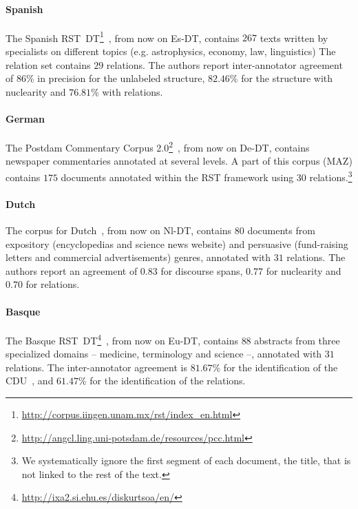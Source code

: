 \documentclass[11pt]{article}
\newcommand{\pcc}{De-DT}
\newcommand{\barst}{Eu-DT}
\newcommand{\sprst}{Es-DT}
\newcommand{\durst}{Nl-DT}
\begin{document}
\paragraph{Spanish}

The Spanish RST~DT\footnote{\url{http://corpus.iingen.unam.mx/rst/index_en.html}}~\cite{dacunha:spanish:2011}, from now on \sprst, contains $267$ texts written by specialists on different topics (e.g. astrophysics, economy, law, linguistics)
The relation set contains $29$ relations.
The authors report inter-annotator agreement of $86$\% in precision for the unlabeled structure, $82.46$\% for the structure with nuclearity and $76.81$\% with relations.

\paragraph{German}

The Postdam Commentary  Corpus 2.0\footnote{\url{http://angcl.ling.uni-potsdam.de/resources/pcc.html}}~\cite{stede:postdam:2004,stede:postdam:2014}, from now on \pcc, contains newspaper commentaries annotated at several levels.
A part of this corpus (MAZ) contains $175$ documents annotated within the  RST framework using $30$ relations.\footnote{We systematically ignore the first segment of each document, the title, that is not linked to the rest of the text.}

\paragraph{Dutch}
The corpus for Dutch~\cite{vliet:building:2011,redeker:multi:2012}, from now on \durst, contains $80$ documents from expository (encyclopedias and science news website) and persuasive (fund-raising letters and commercial advertisements) genres, annotated with $31$ relations.
The authors report an agreement of $0.83$ for discourse spans, $0.77$ for nuclearity and $0.70$ for relations.


\paragraph{Basque}

 The Basque RST~DT\footnote{\url{http://ixa2.si.ehu.es/diskurtsoa/en/}}~\cite{iruskieta:basque:2013}, from now on \barst, contains $88$ abstracts from three specialized domains -- medicine, terminology and science --, annotated with $31$ relations.
 The inter-annotator agreement is $81.67$\% for the identification of the CDU~\cite{iruskieta:qualitative:2015}, and $61.47$\% for the identification of the relations.
\end{document}
